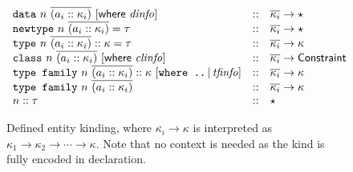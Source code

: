 \begin{figure}

\[
\begin{array}{lcl}
\texttt{data}~n~\overline{(a_i :: \kappa_i)} ~[\textsf{where}~ \mathit{dinfo}] &::& \overline{\kappa_i} \rightarrow \star
\\
\texttt{newtype}~n~\overline{(a_i :: \kappa_i)} = \tau &::& \overline{\kappa_i} \rightarrow \star
\\
\texttt{type}~n~\overline{(a_i :: \kappa_i)} :: \kappa = \tau &::& \overline{\kappa_i} \rightarrow \kappa
\\
\texttt{class}~n~\overline{(a_i :: \kappa_i)} ~[\textsf{where}~ \mathit{clinfo}] &::& \overline{\kappa_i} \rightarrow \textsf{Constraint}
\\
\texttt{type family}~n~\overline{(a_i :: \kappa_i)} :: \kappa ~[\texttt{where ..} \,|\, \mathit{tfinfo}] &::& \overline{\kappa_i} \rightarrow \kappa
\\
\texttt{type family}~n~\overline{(a_i :: \kappa_i)} &::& \overline{\kappa_i} \rightarrow \kappa
\\
n :: \tau &::& \star
\end{array}
\]
\caption{Defined entity kinding, where $\overline{\kappa_i} \rightarrow \kappa$ is interpreted as $\kappa_1 \rightarrow \kappa_2 \rightarrow \cdots \rightarrow \kappa$.  Note that no context is needed as the kind is fully encoded in declaration.}
\end{figure}
